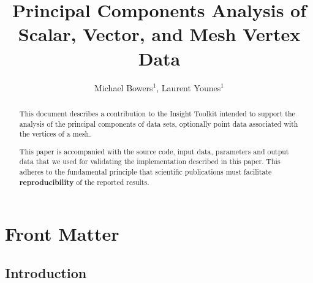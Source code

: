 \documentclass{InsightArticle}
\title{Principal Components Analysis of\\ Scalar, Vector, and Mesh Vertex Data}
\author{Michael Bowers$^{1}$, Laurent Younes$^{1}$}
\newcommand{\IJhandlerIDnumber}{XXXX}
\begin{document}
%
% 
\IJhandlefooter{\IJhandlerIDnumber}


\ifpdf
\else
\fi


\maketitle


\ifhtml
\chapter*{Front Matter\label{front}}
\fi


\begin{abstract}
\noindent
This document describes a contribution to the Insight Toolkit intended to
support the analysis of the principal components of data sets, optionally
point data associated with the vertices of a mesh.

This paper is accompanied with the source code, input data, parameters and
output data that we used for validating the implementation described in this
paper.  This adheres to the fundamental principle that scientific publications
must facilitate \textbf{reproducibility} of the reported results.
\end{abstract}

\tableofcontents

\section{Introduction}
\end{document}
